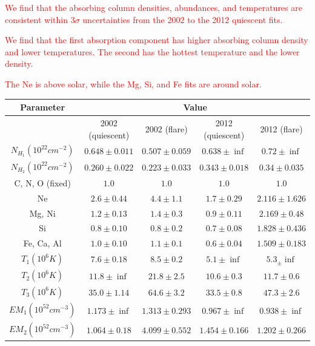 \documentclass[twocolumn]{aastex631}
\newcommand{\red}[1]{\textcolor{red}{#1}}
\begin{document}
\red{We find that the absorbing column densities, abundances, and temperatures are consistent within $3\sigma$ uncertainties from the 2002 to the 2012 quiescent fits. 

We find that the first absorption component has higher absorbing column density and lower temperatures. The second has the hottest temperature and the lower density.

The Ne is above solar, while the Mg, Si, and Fe fits are around solar.
}

\begin{table}[ht]
    \centering
    \begin{tabular}{|c|c|c|c|c|}
     \hline
     Parameter & \multicolumn{4}{c|}{Value}\\
     \hline
      & 2002 (quiescent) & 2002 (flare) & 2012 (quiescent) & 2012 (flare) \\
     \hline
     $N_{H_1} (10^{22} cm^{-2})$ & $0.648\pm0.011$  & $0.507\pm0.059$ & $0.638\pm\inf$  & $0.72\pm\inf$ \\
     $N_{H_2} (10^{22} cm^{-2})$ & $0.260\pm0.022$  & $0.223\pm0.033$ & $0.343\pm0.018$ & $0.34\pm0.035$ \\
     C, N, O (fixed)             &  $1.0$           & $1.0$           & $1.0$           & $1.0$         \\
     Ne                          &  $2.6 \pm 0.44$  &  $4.4 \pm 1.1$  & $1.7 \pm 0.29$  & $2.116\pm1.626$ \\
     Mg, Ni                      &  $1.2 \pm 0.13$  &  $1.4 \pm 0.3$  & $0.9 \pm 0.11$  & $2.169\pm0.48$ \\
     Si                          &  $0.8 \pm 0.10$  &  $0.8 \pm 0.2$  & $0.7 \pm 0.08$  & $1.828\pm0.436$ \\
     Fe, Ca, Al                  &  $1.0 \pm 0.10$  &  $1.1 \pm 0.1$  & $0.6 \pm 0.04$  & $1.509\pm0.183$ \\
     $T_1 (10^6 K)$              &  $7.6 \pm 0.18$  &  $8.5 \pm 0.2$  &   $5.1\pm \inf$ &   $5.3_\pm\inf$ \\
     $T_2 (10^6 K)$              & $11.8 \pm \inf$  & $21.8 \pm 2.5$  &  $10.6\pm0.3$   &  $11.7\pm0.6$   \\
     $T_3 (10^6 K)$              & $35.0 \pm 1.14$  & $64.6 \pm 3.2$  &  $33.5\pm0.8$   &  $47.3\pm2.6$   \\
     $EM_1 (10^{52} cm^{-3})$    &  $1.173 \pm\inf$ & $1.313\pm0.293$ & $0.967\pm\inf$  & $0.938\pm\inf$ \\
     $EM_2 (10^{52} cm^{-3})$    &  $1.064\pm0.18$  & $4.099\pm0.552$ & $1.454\pm0.166$ & $1.202\pm0.266$ \\

\end{tabular}
\end{table}
\end{document}
